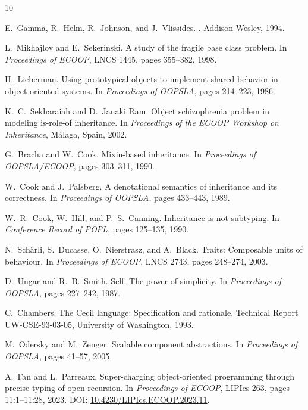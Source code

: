 \documentclass[acmsmall,nonacm]{acmart}
\theoremstyle{acmplain}
\begin{document}
\begin{thebibliography}{10}

E.~Gamma, R.~Helm, R.~Johnson, and J.~Vlissides.
.
\newblock Addison-Wesley, 1994.

L.~Mikhajlov and E.~Sekerinski.
\newblock A study of the fragile base class problem.
\newblock In {\em Proceedings of ECOOP}, LNCS 1445, pages 355--382, 1998.

H.~Lieberman.
\newblock Using prototypical objects to implement shared behavior in
  object-oriented systems.
\newblock In {\em Proceedings of OOPSLA}, pages 214--223, 1986.

K.~C.~Sekharaiah and D.~Janaki Ram.
\newblock Object schizophrenia problem in modeling is-role-of inheritance.
\newblock In {\em Proceedings of the ECOOP Workshop on Inheritance}, M{\'a}laga, Spain, 2002.

G.~Bracha and W.~Cook.
\newblock Mixin-based inheritance.
\newblock In {\em Proceedings of OOPSLA/ECOOP}, pages 303--311, 1990.

W.~Cook and J.~Palsberg.
\newblock A denotational semantics of inheritance and its correctness.
\newblock In {\em Proceedings of OOPSLA}, pages 433--443, 1989.

W.~R.~Cook, W.~Hill, and P.~S.~Canning.
\newblock Inheritance is not subtyping.
\newblock In {\em Conference Record of POPL}, pages 125--135, 1990.

N.~Sch{\"a}rli, S.~Ducasse, O.~Nierstrasz, and A.~Black.
\newblock Traits: Composable units of behaviour.
\newblock In {\em Proceedings of ECOOP}, LNCS 2743, pages 248--274, 2003.

D.~Ungar and R.~B.~Smith.
\newblock Self: The power of simplicity.
\newblock In {\em Proceedings of OOPSLA}, pages 227--242, 1987.

C.~Chambers.
\newblock The {Cecil} language: Specification and rationale.
\newblock Technical Report UW-CSE-93-03-05, University of Washington, 1993.

M.~Odersky and M.~Zenger.
\newblock Scalable component abstractions.
\newblock In {\em Proceedings of OOPSLA}, pages 41--57, 2005.

A.~Fan and L.~Parreaux.
\newblock Super-charging object-oriented programming through precise typing of open recursion.
\newblock In {\em Proceedings of ECOOP}, LIPIcs 263, pages 11:1--11:28, 2023.
\newblock DOI: \href{https://doi.org/10.4230/LIPIcs.ECOOP.2023.11}{10.4230/LIPIcs.ECOOP.2023.11}.


\end{thebibliography}
\end{document}
